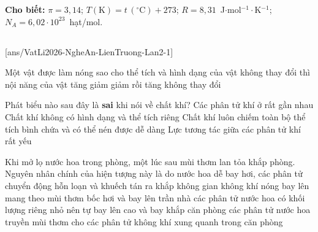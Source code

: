 \def\CheDo{solcolor}%
\def\tenchuong{Liên trường Nghệ An -- Lần 2}
\def\thuonghieu{VẬT LÍ 12 -- Eduzy.com.vn}
\def\TachCauDS{1}
\def\TachCauLG{1}




	\noindent\textbf{Cho biết:} $\pi=3{,}14$; $T(\text{K})=t\,(^\circ\text{C})+273$; $R=8{,}31$~J$\cdot$mol$^{-1}\cdot$K$^{-1}$; $N_A=6{,}02\cdot 10^{23}$~hạt/mol.

	\noindent
	\subsection*{}
	\setcounter{ex}{0}
	[ans/VatLi2026-NgheAn-LienTruong-Lan2-1]

	\begin{ex}%
		Một vật được làm nóng sao cho thể tích và hình dạng của vật không thay đổi thì nội năng của vật
		\choice
		{\True tăng}
		{giảm}
		{giảm rồi tăng}
		{không thay đổi}
	\end{ex}

	\begin{ex}%
		Phát biểu nào sau đây là \textbf{sai} khi nói về chất khí?
		\choice
		{\True Các phân tử khí ở rất gần nhau}
		{Chất khí không có hình dạng và thể tích riêng}
		{Chất khí luôn chiếm toàn bộ thể tích bình chứa và có thể nén được dễ dàng}
		{Lực tương tác giữa các phân tử khí rất yếu}
	\end{ex}

	\begin{ex}%
		Khi mở lọ nước hoa trong phòng, một lúc sau mùi thơm lan tỏa khắp phòng. Nguyên nhân chính của hiện tượng này là do
		\choice
		{\True nước hoa dễ bay hơi, các phân tử chuyển động hỗn loạn và khuếch tán ra khắp không gian}
		{không khí nóng bay lên mang theo mùi thơm bốc hơi và bay lên trần nhà}
		{các phân tử nước hoa có khối lượng riêng nhỏ nên tự bay lên cao và bay khắp căn phòng}
		{các phân tử nước hoa truyền mùi thơm cho các phân tử không khí xung quanh trong căn phòng}
	\end{ex}

